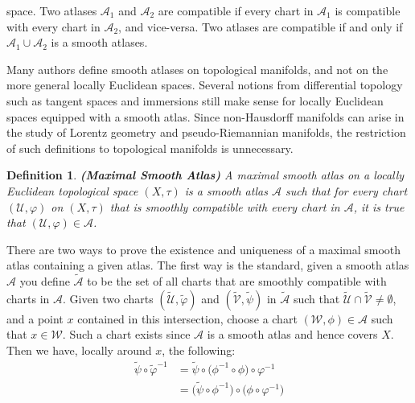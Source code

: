 \documentclass{article}
\theoremstyle{plain}
\theoremstyle{normal}
\newtheorem{definition}{Definition}[section]
\begin{document}
        space. Two atlases $\mathcal{A}_{1}$ and $\mathcal{A}_{2}$ are
        compatible if every chart in $\mathcal{A}_{1}$ is compatible with
        every chart in $\mathcal{A}_{2}$, and vice-versa. Two atlases are
        compatible if and only if $\mathcal{A}_{1}\cup\mathcal{A}_{2}$ is a
        smooth atlases.
        \par\hfill\par
        Many authors define smooth atlases on topological manifolds, and not
        on the more general locally Euclidean spaces. Several notions from
        differential topology such as tangent spaces and immersions still make
        sense for locally Euclidean spaces equipped with a smooth atlas. Since
        non-Hausdorff manifolds can arise in the study of Lorentz geometry and
        pseudo-Riemannian manifolds, the restriction of such definitions to
        topological manifolds is unnecessary.
        \begin{definition}{\textbf{(Maximal Smooth Atlas)}}
            A maximal smooth atlas on a locally Euclidean topological space
            $(X,\tau)$ is a smooth atlas $\mathcal{A}$ such that for every
            chart $(\mathcal{U},\varphi)$ on $(X,\tau)$ that is smoothly
            compatible with every chart in $\mathcal{A}$, it is true that
            $(\mathcal{U},\varphi)\in\mathcal{A}$.
        \end{definition}
        There are two ways to prove the existence and uniqueness of a maximal
        smooth atlas containing a given atlas. The first way is the standard,
        given a smooth atlas $\mathcal{A}$ you define $\tilde{\mathcal{A}}$ to
        be the set of all charts that are smoothly compatible with charts in
        $\mathcal{A}$. Given two charts $(\tilde{\mathcal{U}},\tilde{\varphi})$
        and $(\tilde{\mathcal{V}},\tilde{\psi})$ in $\tilde{\mathcal{A}}$ such
        that $\tilde{\mathcal{U}}\cap\tilde{\mathcal{V}}\ne\emptyset$, and a
        point $x$ contained in this intersection, choose a
        chart $(\mathcal{W},\phi)\in\mathcal{A}$ such that $x\in\mathcal{W}$.
        Such a chart exists since $\mathcal{A}$ is a smooth atlas and hence
        covers $X$. Then we have, locally around $x$, the following:
        \begin{align}
            \tilde{\psi}\circ\tilde{\varphi}^{-1}
                &=\tilde{\psi}\circ\big(
                    \phi^{-1}\circ\phi
                \big)\circ\varphi^{-1}\\
                &=\big(\tilde{\psi}\circ\phi^{-1}\big)\circ
                    \big(\phi\circ\varphi^{-1}\big)
        \end{align}
\end{document}
